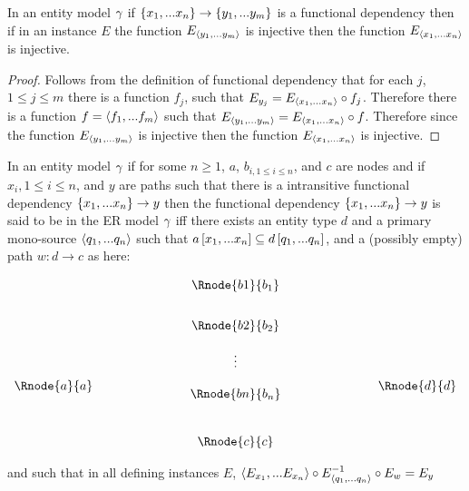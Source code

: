 \begin{lemma}
\label{transitiveinjectivelemma}
In an entity model $\gamma$ if $\left\{x_1,...x_n\right\} \rightarrow \left\{y_1,...y_{m}\right\}$ is a functional dependency then if in an instance $E$ the function $E_{\langle y_1,...y_{m}\rangle}$ is injective then the function $E_{\langle x_1,...x_n\rangle}$  is injective.
\end{lemma}
\begin{proof}
Follows from the definition of functional dependency that for each $j$, $1 \leq j \leq m$  there is a function ${f_j}$,  such that
$E_{y_j}=E_{\langle x_1,...x_n\rangle}\circ f_j$. Therefore there is a function $f=\langle f_1,...f_m\rangle$ such that
$E_{\langle y_1,...y_m\rangle}= E_{\langle x_1,...x_n\rangle}\circ f $. Therefore since  the function $E_{\langle y_1,...y_{m}\rangle}$ is 
injective then the function $E_{\langle x_1,...x_n\rangle}$  is injective.
\end{proof}

\begin{definition}
\noindent In an entity model $\gamma$  
if for some $n \geq 1$, $a$, $b_{i, 1 \leq i \leq n}$,  and $c$ are nodes and 
if  $x_{i}, 1 \leq i \leq n$, and $y$ are paths such
that there is a intransitive functional dependency $\{x_1,...x_n\} \rightarrow y$
 then the functional dependency $\{x_1,...x_n\} \rightarrow y$ is said to be  in the ER model $\gamma$ iff  there exists an entity type $d$ and a primary mono-source
$\langle q_1,...q_n\rangle$  such that $a\left[x_1,...x_n\right]\subseteq d\left[q_1,...q_n\right]$, and a (possibly empty)
path $w:d\rightarrow c$ as here:

\setlength{\arraycolsep}{.2cm}
\begin{center}
$
\begin{array}{cp{2cm}c p{2cm} c}
             &  & \Rnode{b1}{b_1} & &               \\ [0.7cm]
						 &  & \Rnode{b2}{b_2} & &               \\ [0.4cm]
						 &  &     \vdots      & &               \\ [0.2cm]
\Rnode{a}{a} &  &                 & & \Rnode{d}{d}  \\ [-0.2cm]
             &  & \Rnode{bn}{b_n} & &               \\ [0.9cm]
             &  & \Rnode{c}{c}    & &               \\
\end{array}
$
\end{center}

and such that in all defining instances $E$, 
$\langle E_{x_1},...E_{x_n}\rangle \circ E^{-1}_{\langle q_1,...q_n\rangle}\circ E_w = E_y$
\end{definition}

